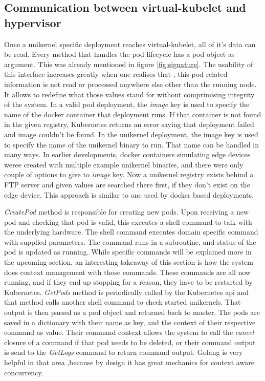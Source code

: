 \subsection{Communication between virtual-kubelet and hypervisor}
Once a unikernel specific deployment reaches virtual-kubelet, all of it's data can be read. Every method that handles the pod lifecycle has a pod object as argument. This was already mentioned in  figure \ref{fig:signature}. The usability of this interface increases greatly when one realises that , this pod related information is not read or processed anywhere else other than the running node. It allows to redefine what those values stand for without comprimising integrity of the system. In a valid pod deployment, the \textit{image} key is used to specify the name of the docker container that deployment runs. If that container is not found in the given registry, Kubernetes returns an error saying that deployment failed and image couldn't be found. In the unikernel deployment, the image key is used to specify the name of the unikernel binary to run. That name can be handled in many ways. In earlier developments, docker containers simulating edge devices weree created with multiple example unikernel binaries, and there were only couple of options to give to \textit{image} key. Now a unikernel registry exists behind a FTP server and given values are searched there first, if they don't exist on the edge device. This approach is similar to one used by docker based deployments.

\textit{CreatePod} method is responsible for creating new pods. Upon receiving a new pod and checking that pod is valid, this  executes a shell command to talk with the underlying hardware. The shell command executes domain specific command with supplied parameters. The command runs in a subroutine, and status of the pod is updated as running. While specific commands will be explained more in the upcoming section, an interesting takeaway of this section is how the system does context management with those commands. These commands are all now running, and if they end up stopping for a reason, they have to be restarted by Kubernetes. \textit{GetPods} method is periodically called by the Kubernetes api and that method calls another shell command to check started unikernels. That output is then parsed as a pod object and returned back to master. The pods are saved in a dictionary with their name as key, and the context of their respective command as value. Their command context allows the system to call the \textit{cancel} closure of a command if that pod needs to be deleted, or their command output is send to the \textit{GetLogs} command to return command output. Golang is very helpful in that area ,because by design it has great mechanics for context aware concurrency.


